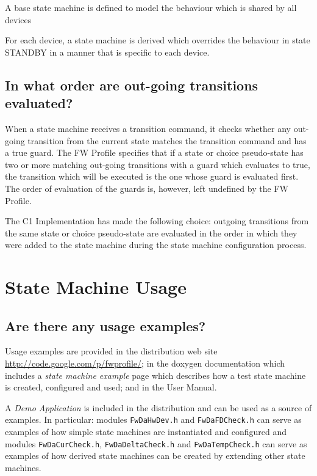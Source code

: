 \documentclass[a4paper,10pt]{article}
\let\stdsection\section
\renewcommand\section{\newpage\stdsection}
\newenvironment{fw_itemize}						%
{\begin{itemize}
  \setlength{\itemsep}{1mm}
  \setlength{\parskip}{0pt}
  \setlength{\parsep}{0pt}}
{\end{itemize}}
\begin{document}
\begin{fw_itemize} 
\item A base state machine is defined to model the behaviour which is shared by all devices
\item For each device, a state machine is derived which overrides the behaviour in state STANDBY in a manner that is specific to each device.
\end{fw_itemize}

\subsection{In what order are out-going transitions evaluated?}
When a state machine receives a transition command, it checks whether any out-going transition from the current state matches the transition command 
and has a true guard. The FW Profile specifies that if a state or choice pseudo-state has two or more matching out-going transitions with a guard which 
evaluates to true, the transition which will be executed is the one whose guard is evaluated first. The order of evaluation of the guards is, however, 
left undefined by the FW Profile. 

The C1 Implementation has made the following choice: outgoing transitions from the same state or choice pseudo-state are evaluated in the order in which 
they were added to the state machine during the state machine configuration process.

\section{State Machine Usage}

\subsection{Are there any usage examples?}
Usage examples are provided in the distribution web site
\url{http://code.google.com/p/fwprofile/}; in 
the doxygen documentation which includes a \emph{state machine example} page which describes how a test state machine is created, configured and used; and in the User Manual.

A \emph{Demo Application} is included in the distribution and can be used as a source of examples. In particular: modules 
\texttt{FwDaHwDev.h} and \texttt{FwDaFDCheck.h} can serve as examples of how simple state machines are instantiated and configured and modules 
\texttt{FwDaCurCheck.h}, \texttt{FwDaDeltaCheck.h} and \texttt{FwDaTempCheck.h} can serve as examples of how derived state machines can be created 
by extending other state machines.
\end{document}

